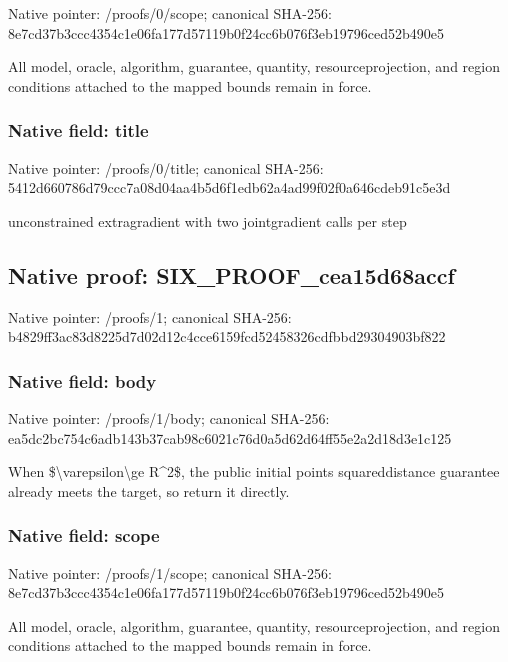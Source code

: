 \documentclass[10pt,a4paper]{article}
\begin{document}
Native pointer: /proofs/0/scope; canonical SHA-256: 8e7cd37b3ccc4354c1e06fa1\allowbreak{}77d57119b0f24cc6b076f3eb\allowbreak{}19796ced52b490e5


All model, oracle, algorithm, guarantee, quantity, resourceprojection, and region conditions attached to the mapped bounds remain in force.


\subsubsection{Native field: title}


Native pointer: /proofs/0/title; canonical SHA-256: 5412d660786d79ccc7a08d04\allowbreak{}aa4b5d6f1edb62a4ad99f02f\allowbreak{}0a646cdeb91c5e3d


unconstrained extragradient with two jointgradient calls per step


\subsection{Native proof: SIX\_PROOF\_cea15d68accf}


Native pointer: /proofs/1; canonical SHA-256: b4829ff3ac83d8225d7d02d1\allowbreak{}2c4cce6159fcd52458326cdf\allowbreak{}bbd29304903bf822



\subsubsection{Native field: body}


Native pointer: /proofs/1/body; canonical SHA-256: ea5dc2bc754c6adb143b37ca\allowbreak{}b98c6021c76d0a5d62d64ff5\allowbreak{}5e2a2d18d3e1c125


When \$\textbackslash{}varepsilon\textbackslash{}ge R\textasciicircum{}2\$, the public initial points squareddistance guarantee already meets the target, so return it directly.


\subsubsection{Native field: scope}


Native pointer: /proofs/1/scope; canonical SHA-256: 8e7cd37b3ccc4354c1e06fa1\allowbreak{}77d57119b0f24cc6b076f3eb\allowbreak{}19796ced52b490e5


All model, oracle, algorithm, guarantee, quantity, resourceprojection, and region conditions attached to the mapped bounds remain in force.
\end{document}
